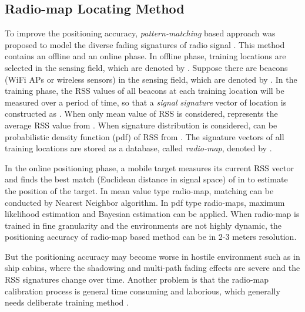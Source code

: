 \documentclass[conference, 10pt]{IEEEtran}
\begin{document}
\subsection{Radio-map Locating Method}
To improve the positioning accuracy, \emph{pattern-matching} based approach was proposed to model the diverse fading signatures of radio signal \cite{haque_profiling-based_2013}\cite{ni_landmarc:_2003}\cite{bahl_radar:_2000}. This method contains an offline and an online phase. In offline phase,  training locations are selected in the sensing field, which are denoted by .  Suppose there are  beacons (WiFi APs or wireless sensors) in the sensing field, which are denoted by .  In the training phase, the RSS values of all beacons at each training location  will be measured over a period of time, so that a \emph{signal signature} vector of location  is constructed as . When only mean value of RSS is considered,  represents the average RSS value from . When signature distribution is considered,   can be probabilistic density function (pdf) of RSS from .  The signature vectors of all training locations are stored as a database,  called \emph{radio-map}, denoted by .  

In the online positioning phase, a mobile target measures its current RSS vector  and finds the best match (Euclidean distance in signal space) of  in  to estimate the position of the target. In mean value type radio-map, matching can be conducted by Nearest Neighbor algorithm\cite{bahl_radar:_2000}. In pdf type radio-maps, maximum likelihood estimation and Bayesian estimation can be applied. 
When radio-map is trained in fine granularity and the environments are not highly dynamic, the positioning accuracy of radio-map based method can be in 2-3 meters resolution. 

But the positioning accuracy may become worse in hostile environment such as in ship cabins, where the shadowing and multi-path fading effects are severe and the RSS signatures change over time.  Another problem is that the radio-map calibration process is general time consuming and laborious, which generally needs deliberate training method \cite{scholl_fast_2012}. 
\end{document}
